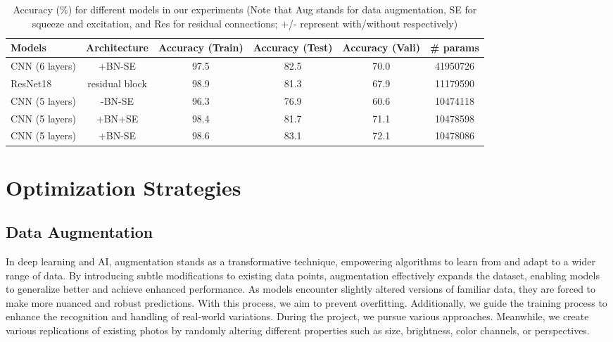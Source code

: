 \begin{table*}[ht]
  \centering
  \begin{tabular}{@{}lccccc@{}}
    \toprule 
    Models & Architecture &  Accuracy (Train) &  Accuracy (Test) & Accuracy (Vali) & \# params \\
    \midrule
    CNN (6 layers) & +BN-SE & 97.5 & 82.5 & 70.0 & 41950726 \\
    ResNet18~\cite{HeZRS16} & residual block & 98.9 & 81.3 & 67.9 & 11179590 \\
    CNN (5 layers) & -BN-SE & 96.3 & 76.9 & 60.6 & 10474118 \\
    CNN (5 layers) & +BN+SE & 98.4 & 81.7 & 71.1 & 10478598 \\
    CNN (5 layers) & +BN-SE & 98.6 & 83.1 & 72.1 & 10478086 \\
    \bottomrule
  \end{tabular}
  \caption{Accuracy (\%) for different models in our experiments 
  (Note that Aug stands for data augmentation, SE for squeeze and excitation, and Res for residual connections; 
  +/- represent with/without respectively)}
  \label{tab:model}
\end{table*}

\section{Optimization Strategies}
\label{sec:optim}


\subsection{Data Augmentation}
\label{sec:optim:aug}

In deep learning and AI, %
augmentation stands as a transformative technique, 
empowering algorithms to learn from and adapt to a wider range of data. 
By introducing subtle modifications to existing data points, 
augmentation effectively expands the dataset, 
enabling models to generalize better and achieve enhanced performance. 
As models encounter slightly altered versions of familiar data, 
they are forced to make more nuanced and robust predictions. 
With this process, we aim to prevent overfitting. %
Additionally, we guide the training process to enhance the recognition and handling of real-world variations.
During the project, we pursue various approaches. 
Meanwhile, we create various replications of existing photos by randomly altering different properties such as size, brightness, color channels, or perspectives.


